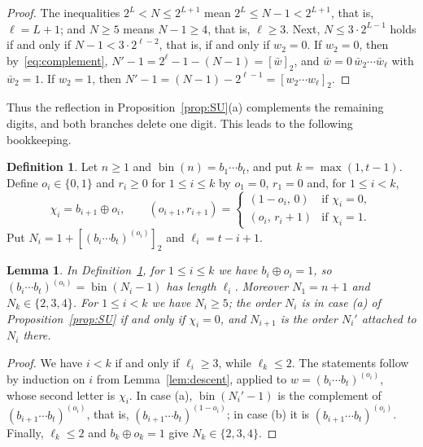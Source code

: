 \documentclass{amsart}
\newtheorem{lemma}[theorem]{Lemma}
\theoremstyle{definition}
\newtheorem{definition}[theorem]{Definition}
\theoremstyle{remark}
\numberwithin{equation}{section}
\newcommand{\val}[1]{[#1]_2}
\newcommand{\bin}{\operatorname{bin}}
\begin{document}
\begin{proof}
The inequalities $2^L<N\le2^{L+1}$ mean $2^L\le N-1<2^{L+1}$, that is, $\ell=L+1$; and $N\ge5$ means $N-1\ge4$, that is, $\ell\ge3$. Next, $N\le3\cdot2^{L-1}$ holds if and only if $N-1<3\cdot2^{\ell-2}$, that is, if and only if $w_2=0$. If $w_2=0$, then by~\eqref{eq:complement}, $N'-1=2^{\ell}-1-(N-1)=\val{\bar w}$, and $\bar w=0\,\bar w_2\cdots\bar w_\ell$ with $\bar w_2=1$. If $w_2=1$, then $N'-1=(N-1)-2^{\ell-1}=\val{w_2\cdots w_\ell}$.
\end{proof}

Thus the reflection in Proposition~\ref{prop:SU}(a) complements the remaining digits, and both branches delete one digit. This leads to the following bookkeeping.

\begin{definition}\label{def:descent}
Let $n\ge1$ and $\bin(n)=b_1\cdots b_t$, and put $k=\max(1,t-1)$. Define $o_i\in\{0,1\}$ and $r_i\ge0$ for $1\le i\le k$ by $o_1=0$, $r_1=0$ and, for $1\le i<k$,
\[
\chi_i=b_{i+1}\oplus o_i,\qquad
(o_{i+1},r_{i+1})=
\begin{cases}
(1-o_i,\,0)&\text{if }\chi_i=0,\\
(o_i,\,r_i+1)&\text{if }\chi_i=1.
\end{cases}
\]
Put $N_i=1+\val{(b_i\cdots b_t)^{(o_i)}}$ and $\ell_i=t-i+1$.
\end{definition}

\begin{lemma}\label{lem:stages}
In Definition~\ref{def:descent}, for $1\le i\le k$ we have $b_i\oplus o_i=1$, so $(b_i\cdots b_t)^{(o_i)}=\bin(N_i-1)$ has length $\ell_i$. Moreover $N_1=n+1$ and $N_k\in\{2,3,4\}$. For $1\le i<k$ we have $N_i\ge5$; the order $N_i$ is in case \textup{(a)} of Proposition~\ref{prop:SU} if and only if $\chi_i=0$, and $N_{i+1}$ is the order $N_i'$ attached to $N_i$ there.
\end{lemma}

\begin{proof}
We have $i<k$ if and only if $\ell_i\ge3$, while $\ell_k\le2$. The statements follow by induction on $i$ from Lemma~\ref{lem:descent}, applied to $w=(b_i\cdots b_t)^{(o_i)}$, whose second letter is $\chi_i$. In case (a), $\bin(N_i'-1)$ is the complement of $(b_{i+1}\cdots b_t)^{(o_i)}$, that is, $(b_{i+1}\cdots b_t)^{(1-o_i)}$; in case (b) it is $(b_{i+1}\cdots b_t)^{(o_i)}$. Finally, $\ell_k\le2$ and $b_k\oplus o_k=1$ give $N_k\in\{2,3,4\}$.
\end{proof}
\end{document}
